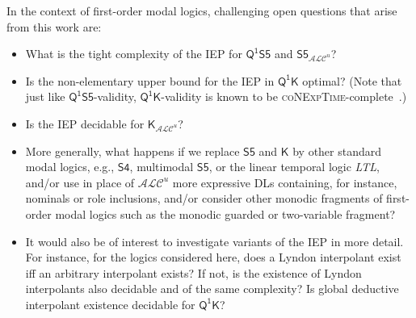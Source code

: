 \documentclass[10pt,a4paper]{amsart}
\theoremstyle{plain}
\theoremstyle{definition}
\newcommand{\nz}[1]{\textcolor{blue}{\bf!}%
	\marginpar[\parbox{15mm}{\raggedleft\scriptsize\textcolor{blue}{#1}}]%
	{\parbox{15mm}{\raggedright\scriptsize\textcolor{blue}{#1}}}}
\newcommand{\LTL}{\textsl{LTL}}
\newcommand{\FOMK}{\ensuremath{\mathsf{Q^1K}}}
\newcommand{\FOMS}{\ensuremath{\mathsf{Q^1S5}}}
\newcommand{\ALCIOS}{\ensuremath{\mathsf{S5}_{\mathcal{ALC}^u}}}
\begin{document}
%

In the context of first-order modal logics, 
challenging open questions that arise from this work are: 
%
\begin{itemize}
\item[--] What is the tight complexity of the IEP for \FOMS{} and $\ALCIOS$? 
%
\item[--] Is the non-elementary upper bound for the IEP in \FOMK{} optimal? (Note that just like \FOMS-validity, \FOMK-validity is known to be \textsc{coNExpTime}-complete~\cite{DBLP:journals/logcom/Marx99}.)
%
\item[--] Is the IEP decidable for $\mathsf{K}_{\mathcal{ALC}^{u}}$?
%
\item[--] More generally, what happens if we replace $\mathsf{S5}$ and $\mathsf{K}$ by other standard modal logics, e.g., $\mathsf{S4}$, multimodal $\mathsf{S5}$, or the linear temporal logic \LTL, and/or use in place of $\mathcal{ALC}^{u}$ more expressive DLs containing, for instance, nominals or role inclusions, and/or consider other monodic fragments of first-order modal logics such as the monodic guarded or two-variable fragment?
\item[--] It would also be of interest to investigate variants of the IEP in more detail. For instance, for the logics considered here, does a Lyndon interpolant exist iff an arbitrary interpolant exists? If not, is the existence of Lyndon interpolants also decidable and of the same complexity? Is global deductive interpolant existence decidable for \FOMK{}? 
\end{itemize}
%
\end{document}
